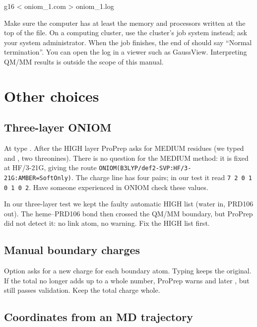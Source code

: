 \begin{terminal}
g16 < oniom_1.com > oniom_1.log
\end{terminal}

Make sure the computer has at least the memory and processors written at the
top of the file. On a computing cluster, use the cluster's job system
instead; ask your system administrator. When the job finishes, the end of
 should say ``Normal termination''. You can open the log
in a viewer such as GaussView. Interpreting QM/MM results is outside the scope
of this manual.

\section{Other choices}
\label{sec:qmmm-other}

\subsection{Three-layer ONIOM}

At  type . After the HIGH layer
ProPrep asks for MEDIUM residues (we typed  and , two
threonines). There is no question for the MEDIUM method: it is fixed at
HF/3-21G, giving the route
\texttt{ONIOM(B3LYP/def2-SVP:HF/3-21G:AMBER=SoftOnly)}. The charge line has
four pairs; in our test it read \texttt{7 2 0 1 0 1 0 2}. Have someone
experienced in ONIOM check these values.

\begin{watchout}
In our three-layer test we kept the faulty automatic HIGH list (water in,
PRD106 out). The heme--PRD106 bond then crossed the QM/MM boundary, but
ProPrep did not detect it: no link atom, no warning. Fix the HIGH list first.
\end{watchout}

\subsection{Manual boundary charges}

Option  asks for a new charge for each boundary atom. Typing 
keeps the original. If the total no longer adds up to a whole number, ProPrep
warns  and later
, but still
passes validation. Keep the total charge whole.

\subsection{Coordinates from an MD trajectory}

